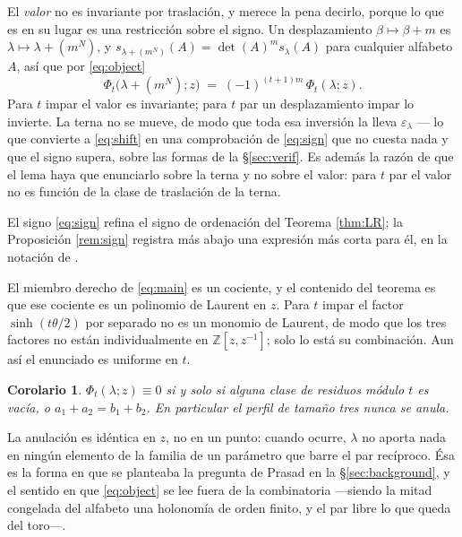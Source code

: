 \documentclass[11pt,reqno]{amsart}
\theoremstyle{plain}
\newtheorem{corollary}[theorem]{Corolario}
\theoremstyle{definition}
\newcommand{\ZZ}{\mathbb{Z}}
\begin{document}
El \emph{valor} no es invariante por traslación, y merece la pena decirlo, porque lo que es en su
lugar es una restricción sobre el signo. Un desplazamiento $\beta\mapsto\beta+m$ es
$\lambda\mapsto\lambda+(m^N)$, y $s_{\lambda+(m^N)}(A)=\det(A)^{m}s_\lambda(A)$ para cualquier
alfabeto $A$, así que por \eqref{eq:object}
\begin{equation}\label{eq:shift}
\Phi_t\bigl(\lambda+(m^N);z\bigr)\;=\;(-1)^{(t+1)m}\,\Phi_t(\lambda;z).
\end{equation}
Para $t$ impar el valor es invariante; para $t$ par un desplazamiento impar lo invierte. La terna no
se mueve, de modo que toda esa inversión la lleva $\varepsilon_\lambda$ --- lo que convierte a
\eqref{eq:shift} en una comprobación de \eqref{eq:sign} que no cuesta nada y que el signo supera,
sobre las formas de la \S\ref{sec:verif}. Es además la razón de que el lema haya que enunciarlo sobre
la terna y no sobre el valor: para $t$ par el valor no es función de la clase de traslación de la
terna.

El signo \eqref{eq:sign} refina el signo de ordenación del Teorema
\ref{thm:LR}; la Proposición \ref{rem:sign} registra más abajo una expresión más corta para él, en la
notación de \cite{AK25}.

El miembro derecho de \eqref{eq:main} es un cociente, y el contenido del teorema es que ese cociente
es un polinomio de Laurent en $z$. Para $t$ impar el factor $\sinh(t\theta/2)$ por separado no es un
monomio de Laurent, de modo que los tres factores no están individualmente en $\ZZ[z,z^{-1}]$; solo
lo está su combinación. Aun así el enunciado es uniforme en $t$.

\begin{corollary}\label{cor:zero}
$\Phi_t(\lambda;z)\equiv0$ si y solo si alguna clase de residuos módulo $t$ es vacía, o
$a_1+a_2=b_1+b_2$. En particular el perfil de tamaño tres nunca se anula.
\end{corollary}

\noindent La anulación es idéntica en $z$, no en un punto: cuando ocurre, $\lambda$ no aporta nada en
ningún elemento de la familia de un parámetro que barre el par recíproco. Ésa es la forma en que se
planteaba la pregunta de Prasad en la \S\ref{sec:background}, y el sentido en que \eqref{eq:object}
se lee fuera de la combinatoria ---siendo la mitad congelada del alfabeto una holonomía de orden
finito, y el par libre lo que queda del toro---.
\end{document}
